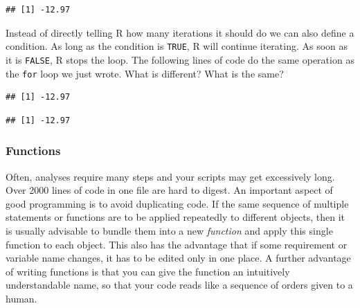 \documentclass[
]{book}
\newenvironment{Shaded}{\begin{snugshade}}{\end{snugshade}}
\newcommand{\CommentTok}[1]{\textcolor[rgb]{0.56,0.35,0.01}{\textit{#1}}}
\newcommand{\ControlFlowTok}[1]{\textcolor[rgb]{0.13,0.29,0.53}{\textbf{#1}}}
\newcommand{\DecValTok}[1]{\textcolor[rgb]{0.00,0.00,0.81}{#1}}
\newcommand{\FunctionTok}[1]{\textcolor[rgb]{0.00,0.00,0.00}{#1}}
\newcommand{\NormalTok}[1]{#1}
\newcommand{\OtherTok}[1]{\textcolor[rgb]{0.56,0.35,0.01}{#1}}
\newcommand{\SpecialCharTok}[1]{\textcolor[rgb]{0.00,0.00,0.00}{#1}}
\begin{document}
\begin{verbatim}
## [1] -12.97
\end{verbatim}

Instead of directly telling R how many iterations it should do we can also define a condition. As long as the condition is \texttt{TRUE}, R will continue iterating. As soon as it is \texttt{FALSE}, R stops the loop. The following lines of code do the same operation as the \texttt{for} loop we just wrote. What is different? What is the same?

\begin{Shaded}
\end{Shaded}

\begin{verbatim}
## [1] -12.97
\end{verbatim}

\begin{Shaded}
\end{Shaded}

\begin{verbatim}
## [1] -12.97
\end{verbatim}

\hypertarget{functions}{%
\subsubsection{Functions}\label{functions}}

Often, analyses require many steps and your scripts may get excessively long. Over 2000 lines of code in one file are hard to digest. An important aspect of good programming is to avoid duplicating code. If the same sequence of multiple statements or functions are to be applied repeatedly to different objects, then it is usually advisable to bundle them into a new \emph{function} and apply this single function to each object. This also has the advantage that if some requirement or variable name changes, it has to be edited only in one place. A further advantage of writing functions is that you can give the function an intuitively understandable name, so that your code reads like a sequence of orders given to a human.
\end{document}
